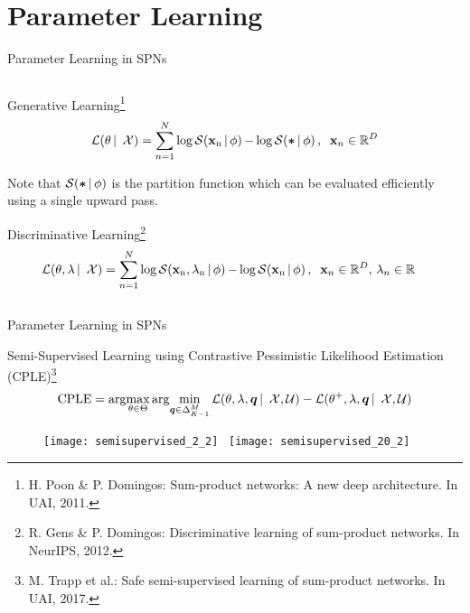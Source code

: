 \section{Parameter Learning}

\begin{frame}{Parameter Learning in SPNs}{}
\begin{columns}
\begin{column}{\linewidth}
\begin{block}{Generative Learning\footnote{\scriptsize H. Poon \& P. Domingos: Sum-product networks: A new deep architecture. In UAI, 2011.}}
\begin{equation}
  \mathcal{L}(\theta \,| \, \mathcal{X}) = \sum_{n=1}^N \log \f - \log \fz\, , \; \; \xn \in \mathbb{R}^D
\end{equation}
\end{block}
Note that $\operatorname*{\mathcal{S}(\bm \ast \,|\, \phi)}$ is the partition function which can be evaluated efficiently using a single upward pass.
\begin{block}{Discriminative Learning\footnote{\scriptsize R. Gens \& P. Domingos: Discriminative learning of sum-product networks. In NeurIPS, 2012.}}
\begin{equation}
  \begin{aligned}
    \mathcal{L}(\theta, \lambda \,| \, \mathcal{X}) = \sum_{n=1}^N &\log \fy - \log \f\, , \; \; \xn \in \mathbb{R}^D, \, \lambda_n \in \mathbb{R}
\end{aligned}
\end{equation}
\end{block}
\end{column}
\end{columns}
\end{frame}

\begin{frame}{Parameter Learning in SPNs}{}
\begin{block}{Semi-Supervised Learning using Contrastive Pessimistic Likelihood Estimation (CPLE)\footnote{\scriptsize M. Trapp et al.: Safe semi-supervised learning of sum-product networks. In UAI, 2017.}}
\begin{equation}
  \text{CPLE} = \argmax_{\theta \in \Theta} \argmin_{\bm q \in \Delta_{K-1}^M} \mathcal{L}(\theta,  \lambda, \bm{q} \,| \, \mathcal{X}, \mathcal{U}) - \mathcal{L}(\theta^+, \lambda, \bm{q} \,| \, \mathcal{X}, \mathcal{U})
\end{equation}
\end{block}

\begin{figure}
  \texttt{[image: semisupervised\_2\_2]}~
   \texttt{[image: semisupervised\_20\_2]}
\end{figure}

\end{frame}

